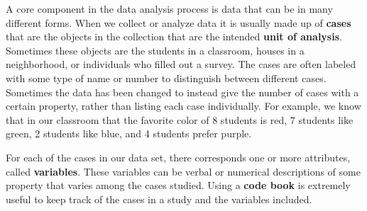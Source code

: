 \documentclass[
]{book}
\theoremstyle{definition}
\theoremstyle{definition}
\theoremstyle{definition}
\theoremstyle{definition}
\theoremstyle{remark}
\begin{document}
A core component in the data analysis process is data that can be in many different forms. When we collect or analyze data it is usually made up of \textbf{cases} that are the objects in the collection that are the intended \textbf{unit of analysis}. Sometimes these objects are the students in a classroom, houses in a neighborhood, or individuals who filled out a survey. The cases are often labeled with some type of name or number to distinguish between different cases. Sometimes the data has been changed to instead give the number of cases with a certain property, rather than listing each case individually. For example, we know that in our classroom that the favorite color of 8 students is red, 7 students like green, 2 students like blue, and 4 students prefer purple.

For each of the cases in our data set, there corresponds one or more attributes, called \textbf{variables}. These variables can be verbal or numerical descriptions of some property that varies among the cases studied. Using a \textbf{code book} is extremely useful to keep track of the cases in a study and the variables included.
\end{document}
